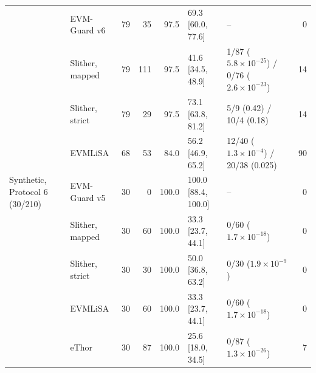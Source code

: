 \documentclass[pdflatex,sn-mathphys]{sn-jnl}
\theoremstyle{thmstyletwo}
\theoremstyle{thmstyletwo}
\begin{document}
\begin{table}[t]
{\begin{tabular}{@{}llrrrllr@{}}
 & EVM-Guard v6 & 79 & 35 & 97.5 & 69.3 [60.0, 77.6] & -- & 0 \\
 & Slither, mapped & 79 & 111 & 97.5 & 41.6 [34.5, 48.9] & 1/87 ($5.8 \times 10^{-25}$) / 0/76 ($2.6 \times 10^{-23}$) & 14 \\
 & Slither, strict & 79 & 29 & 97.5 & 73.1 [63.8, 81.2] & 5/9 (0.42) / 10/4 (0.18) & 14 \\
 & EVMLiSA & 68 & 53 & 84.0 & 56.2 [46.9, 65.2] & 12/40 ($1.3 \times 10^{-4}$) / 20/38 (0.025) & 90 \\
\midrule
Synthetic, Protocol 6 (30/210) & EVM-Guard v5 & 30 & 0 & 100.0 & 100.0 [88.4, 100.0] & -- & 0 \\
 & Slither, mapped & 30 & 60 & 100.0 & 33.3 [23.7, 44.1] & 0/60 ($1.7 \times 10^{-18}$) & 0 \\
 & Slither, strict & 30 & 30 & 100.0 & 50.0 [36.8, 63.2] & 0/30 ($1.9 \times 10^{-9}$) & 0 \\
 & EVMLiSA & 30 & 60 & 100.0 & 33.3 [23.7, 44.1] & 0/60 ($1.7 \times 10^{-18}$) & 0 \\
 & eThor & 30 & 87 & 100.0 & 25.6 [18.0, 34.5] & 0/87 ($1.3 \times 10^{-26}$) & 7 \\
\bottomrule
\end{tabular}%
}
\end{table}
\end{document}
